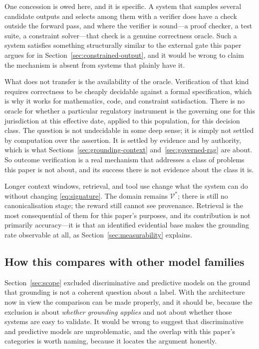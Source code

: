 One concession is owed here, and it is specific. A system that samples several
candidate outputs and selects among them with a verifier does have a check outside the
forward pass, and where the verifier is sound---a proof checker, a test suite, a
constraint solver---that check is a genuine correctness oracle. Such a system satisfies
something structurally similar to the external gate this paper argues for in
Section~\ref{sec:constrained-output}, and it would be wrong to claim the mechanism is
absent from systems that plainly have it.

What does not transfer is the availability of the oracle. Verification of that kind
requires correctness to be cheaply decidable against a formal specification, which is
why it works for mathematics, code, and constraint satisfaction. There is no oracle
for whether a particular regulatory instrument is the governing one for this
jurisdiction at this effective date, applied to this population, for this decision
class. The question is not undecidable in some deep sense; it is simply not settled by
computation over the assertion. It is settled by evidence and by authority, which is
what Sections~\ref{sec:grounding-context} and~\ref{sec:governed-rag} are about. So
outcome verification is a real mechanism that addresses a class of problems this paper
is not about, and its success there is not evidence about the class it is.

Longer context windows, retrieval, and tool use change what the system can do without
changing \eqref{eq:signature}. The domain
remains $\mathcal{V}^{*}$; there is still no canonicalisation stage; the reward
still cannot see provenance. Retrieval is the most consequential of them for this
paper's purposes, and its contribution is not primarily accuracy---it is that an
identified evidential base makes the grounding rate observable at all, as
Section~\ref{sec:measurability} explains.

\subsection{How this compares with other model families}
\label{sec:not-easier}

Section~\ref{sec:scope} excluded discriminative and predictive models on the ground
that grounding is not a coherent question about a label. With the architecture now in
view the comparison can be made properly, and it should be, because the exclusion is
about \emph{whether grounding applies} and not about whether those systems are easy to
validate. It would be wrong to suggest that discriminative
and predictive models are unproblematic, and the overlap with this paper's categories
is worth naming, because it locates the argument honestly.

